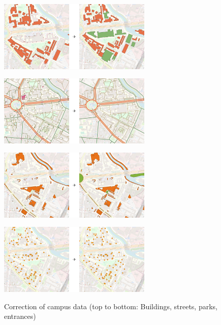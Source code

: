 \begin{figure}[H]
	\centering
	\includegraphics[width=0.65\textwidth]{images/preparing_buildings.png}\\
\end{figure}

\begin{figure}[H]
	\centering
	\includegraphics[width=0.65\textwidth]{images/preparing_streets.png}\\
\end{figure}

\begin{figure}[H]
	\centering
	\includegraphics[width=0.65\textwidth]{images/preparing_green_areas.png}\\
\end{figure}

\begin{figure}[H]
	\centering
	\includegraphics[width=0.65\textwidth]{images/preparing_entrances.png}\\
	\caption{Correction of campus data (top to bottom: Buildings, streets, parks, entrances)}
\end{figure}

